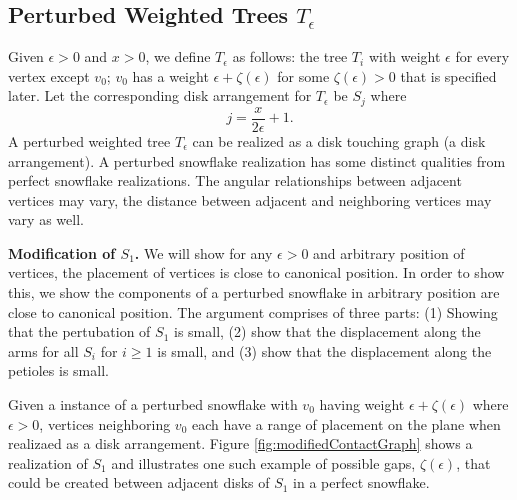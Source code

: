 \subsection{Perturbed Weighted Trees $T_\epsilon$}
Given $\epsilon > 0$ and $x >0$, we define $T_\epsilon$ as follows: the tree $T_i$ with weight $\epsilon$ for every vertex except $v_0$; $v_0$ has a weight $\epsilon + \zeta(\epsilon)$ for some $\zeta(\epsilon)>0$ that is specified later.  
Let the corresponding disk arrangement for $T_\epsilon$ be $S_j$ where $$j=\frac{x}{2 \epsilon} + 1.$$  
A perturbed weighted tree $T_\epsilon$ can be realized as a disk touching graph (a disk arrangement).  
A perturbed snowflake realization has some distinct qualities from perfect snowflake realizations.  
The angular relationships between adjacent vertices may vary, the distance between adjacent and neighboring vertices may vary as well.

\textbf{Modification of $S_1$.}
We will show for any $\epsilon >0$ and arbitrary position of vertices, the placement of vertices is close to canonical position.  
In order to show this, we show the components of a perturbed snowflake in arbitrary position  are close to canonical position.  
The argument comprises of three parts: (1) Showing that the pertubation of $S_1$ is small, (2) show that the displacement along the arms for all $S_i$ for $i \geq 1$ is small, and (3) show that the displacement along the petioles is small.  

Given a instance of a perturbed snowflake with $v_0$ having weight $\epsilon + \zeta(\epsilon)$ where $\epsilon > 0$, vertices neighboring $v_0$ each have a range of placement on the plane when realizaed as a disk arrangement. 
Figure \ref{fig:modifiedContactGraph} shows a realization of $S_1$ and illustrates one such example of possible gaps, $\zeta(\epsilon)$, that could be created between adjacent disks of $S_1$ in a perfect snowflake.  

